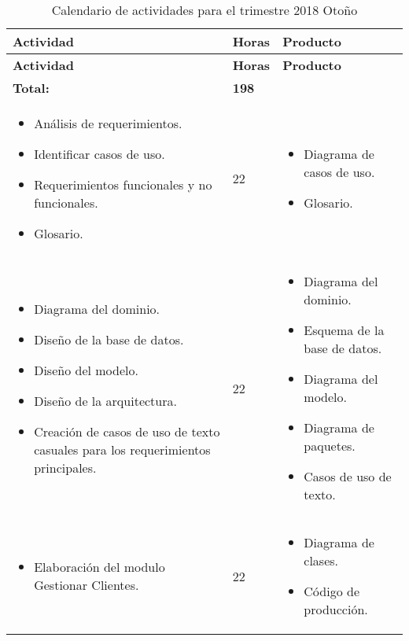 \begin{longtabu} to \textwidth{
		X[3,c] X[1,c] X[3,c]}
	\toprule
	\textbf{Actividad} & \textbf{Horas} & \textbf{Producto} \\
	\hline
	\endfirsthead
	\hline
	\textbf{Actividad} & \textbf{Horas} & \textbf{Producto} \\
	\hline
	\endhead
	\hline
	\endfoot
	\hline
	\textbf{Total:} & \textbf{198} & \\
	\hline
	\caption{Calendario de actividades para el trimestre 2018 Otoño}
	\label{table:calendar}
	\endlastfoot
	
	\begin{itemize}
		\item Análisis de requerimientos.
		\item Identificar casos de uso.
		\item Requerimientos funcionales y no funcionales.
		\item Glosario.
	\end{itemize} & 22 &
	\begin{itemize}
		\item Diagrama de casos de uso.
		\item Glosario.
	\end{itemize} \\ \midrule

	\begin{itemize}
		\item Diagrama del dominio.
		\item Diseño de la base de datos.
		\item Diseño del modelo.
		\item Diseño de la arquitectura.
		\item Creación de casos de uso de texto casuales para los requerimientos principales.
	\end{itemize} & 22 &
	\begin{itemize}
		\item Diagrama del dominio.
		\item Esquema de la base de datos.
		\item Diagrama del modelo.
		\item Diagrama de paquetes.
		\item Casos de uso de texto.
	\end{itemize} \\ \midrule

	\begin{itemize}
		\item  Elaboraci\'on del modulo Gestionar Clientes.
	\end{itemize} & 22 &
	\begin{itemize}
		\item Diagrama de clases.
		\item Código de producci\'on.
	\end{itemize} \\ \midrule


\end{longtabu}
